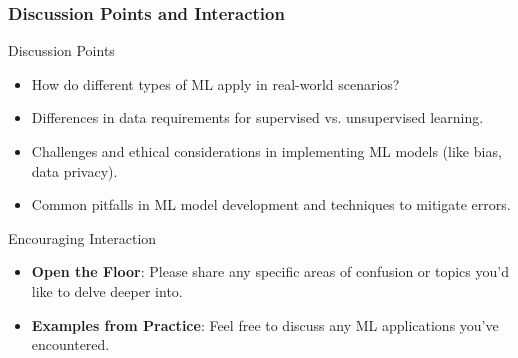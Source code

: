 \documentclass[aspectratio=169]{beamer}
\begin{document}
\begin{frame}[fragile]
    \frametitle{Discussion Points and Interaction}
    \begin{block}{Discussion Points}
        \begin{itemize}
            \item How do different types of ML apply in real-world scenarios?
            \item Differences in data requirements for supervised vs. unsupervised learning.
            \item Challenges and ethical considerations in implementing ML models (like bias, data privacy).
            \item Common pitfalls in ML model development and techniques to mitigate errors.
        \end{itemize}
    \end{block}
    
    \begin{block}{Encouraging Interaction}
        \begin{itemize}
            \item \textbf{Open the Floor}: Please share any specific areas of confusion or topics you'd like to delve deeper into.
            \item \textbf{Examples from Practice}: Feel free to discuss any ML applications you've encountered.
        \end{itemize}
    \end{block}
\end{frame}
\end{document}
